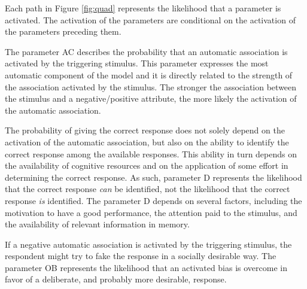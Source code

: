 \documentclass[12pt]{book}
\begin{document}
  

Each path in Figure \ref{fig:quad} represents the likelihood that a parameter is activated. The activation of the parameters are conditional on the activation of the parameters preceding them. 

The parameter AC describes the probability that an automatic association is activated by the triggering stimulus. This parameter expresses the most automatic component of the model and it is directly related to the strength of the association activated by the stimulus. The stronger the association between the stimulus and a negative/positive attribute, the more likely the activation of the automatic association.

The probability of giving the correct response does not solely depend on the activation of the automatic association, but also on the ability to identify the correct response among the available responses. This ability in turn depends on the availability of cognitive resources and on the application of some effort in determining the correct response. As such, parameter D represents the likelihood that the correct response \emph{can} be identified, not the likelihood that the correct response \emph{is} identified. The parameter D depends on several factors, including the motivation to have a good performance, the attention paid to the stimulus, and the availability of relevant information in memory.

If a negative automatic association is activated by the triggering stimulus, the respondent might try to fake the response in a socially desirable way. The parameter OB represents the likelihood that an activated bias is overcome in favor of a deliberate, and probably more desirable, response. 
\end{document}

